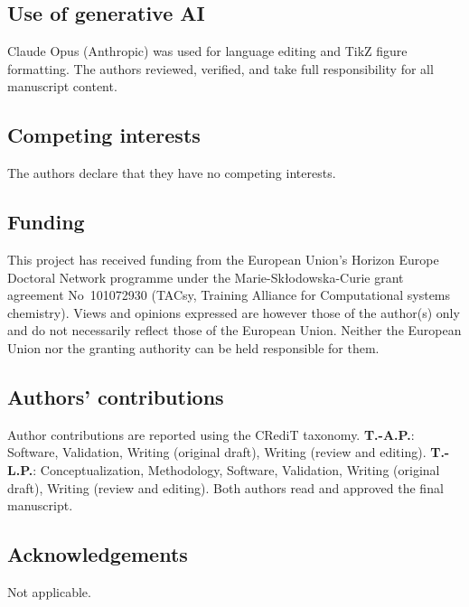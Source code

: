 \documentclass[10pt,a4paper,fleqn]{article}
\begin{document}
\subsection*{Use of generative AI}
Claude Opus (Anthropic) was used for language editing and TikZ figure formatting. The authors reviewed, verified, and take full responsibility for all manuscript content.

\subsection*{Competing interests}
The authors declare that they have no competing interests.

\subsection*{Funding}
This project has received funding from the European Union's Horizon Europe
Doctoral Network programme under the Marie-Sk{\l}odowska-Curie grant agreement
No~101072930 (TACsy, Training Alliance for Computational systems chemistry).
Views and opinions expressed are however those of the author(s) only and do not necessarily reflect those of the European Union. Neither the European Union nor the granting authority can be held responsible for them.

\subsection*{Authors' contributions}
Author contributions are reported using the CRediT taxonomy. \textbf{T.-A.P.}: Software, Validation, Writing (original draft), Writing (review and editing). \textbf{T.-L.P.}: Conceptualization, Methodology, Software, Validation, Writing (original draft), Writing (review and editing). Both authors read and approved the final manuscript.

\subsection*{Acknowledgements}
Not applicable.


\end{document}
